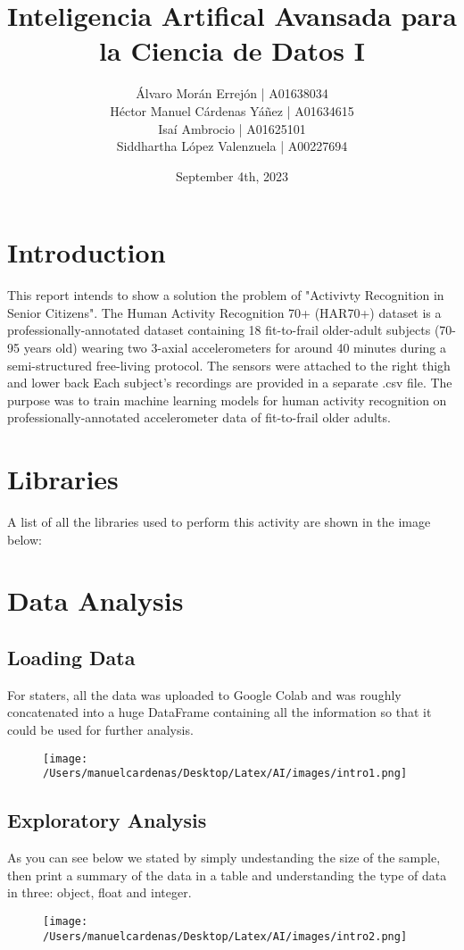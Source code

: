 \documentclass{article}
\title{Inteligencia Artifical Avansada para la Ciencia de Datos I}
\author{Álvaro Morán Errejón 		     | A01638034\\Héctor Manuel Cárdenas Yáñez	 | A01634615\\Isaí Ambrocio				     | A01625101\\Siddhartha López Valenzuela      | A00227694}
\date{September 4th, 2023}
\begin{document}
\maketitle

\section{Introduction}
This report intends to show a solution the problem of "Activivty Recognition in Senior Citizens".  The Human Activity Recognition 70+ (HAR70+) dataset is a professionally-annotated dataset containing 18 fit-to-frail older-adult subjects (70-95 years old) wearing two 3-axial accelerometers for around 40 minutes during a semi-structured free-living protocol. The sensors were attached to the right thigh and lower back
Each subject's recordings are provided in a separate .csv file. The purpose was to train machine learning models for human activity recognition on professionally-annotated accelerometer data of fit-to-frail older adults.

\section{Libraries}
A list of all the libraries used to perform this activity are shown in the image below:

\section{Data Analysis}
    \subsection{Loading Data}

    For staters, all the data was uploaded to Google Colab and was roughly concatenated into a huge DataFrame containing 
    all the information so that it could be used for further analysis. \pagebreak
    \begin{figure}[h]
        \centering
        \texttt{[image: /Users/manuelcardenas/Desktop/Latex/AI/images/intro1.png]}
        \label{fig:intro1}
    \end{figure}




    \subsection{Exploratory Analysis}

    As you can see below we stated by simply undestanding the size of the sample, then print a summary of the data 
    in a table and understanding the type of data in three: object, float and integer. \pagebreak
    \begin{figure}[h]
        \centering
        \texttt{[image: /Users/manuelcardenas/Desktop/Latex/AI/images/intro2.png]}
        \label{fig:intro2}
    \end{figure}
\end{document}
